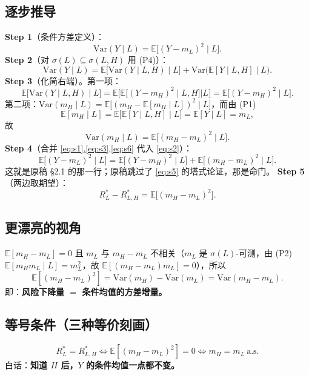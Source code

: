 \documentclass[UTF8,11pt,a4paper]{ctexart}
\newcommand{\E}{\mathbb{E}}
\newcommand{\Var}{\mathrm{Var}}
\begin{document}
\subsection{逐步推导}
\textbf{Step 1}（条件方差定义）：
\begin{equation}
\Var(Y\mid L)=\E\big[(Y-m_L)^2\mid L\big]. \label{eq:s1}
\end{equation}
\textbf{Step 2}（对 $\sigma(L)\subseteq\sigma(L,H)$ 用 (P4)）：
\begin{equation}
\Var(Y\mid L)=\E\big[\Var(Y\mid L,H)\mid L\big]+\Var\big(\E[Y\mid L,H]\mid L\big). \label{eq:s2}
\end{equation}
\textbf{Step 3}（化简右端）。第一项：
\begin{equation}
\E\big[\Var(Y\mid L,H)\mid L\big]
=\E\Big[\E\big[(Y-m_H)^2\mid L,H\big]\Big|L\Big]
=\E\big[(Y-m_H)^2\mid L\big]. \label{eq:s3}
\end{equation}
第二项：$\Var(m_H\mid L)=\E\big[(m_H-\E[m_H\mid L])^2\mid L\big]$，而由 (P1)
\begin{equation}
\E[m_H\mid L]=\E\big[\E[Y\mid L,H]\mid L\big]=\E[Y\mid L]=m_L, \label{eq:s5}
\end{equation}
故
\begin{equation}
\Var(m_H\mid L)=\E\big[(m_H-m_L)^2\mid L\big]. \label{eq:s6}
\end{equation}
\textbf{Step 4}（合并 \eqref{eq:s1},\eqref{eq:s3},\eqref{eq:s6} 代入 \eqref{eq:s2}）：
\begin{equation}
\E\big[(Y-m_L)^2\mid L\big]
=\E\big[(Y-m_H)^2\mid L\big]+\E\big[(m_H-m_L)^2\mid L\big]. \label{eq:s7}
\end{equation}
这就是原稿 §2.1 的那一行；原稿跳过了 \eqref{eq:s5} 的塔式论证，那是命门。
\textbf{Step 5}（两边取期望）：
\begin{equation}
R_L^*-R_{L,H}^*=\E\big[(m_H-m_L)^2\big]. \label{eq:s8}
\end{equation}

\subsection{更漂亮的视角}
$\E[m_H-m_L]=0$ 且 $m_L$ 与 $m_H-m_L$ 不相关（$m_L$ 是 $\sigma(L)$-可测，由 (P2) $\E[m_H m_L\mid L]=m_L^2$，故 $\E[(m_H-m_L)m_L]=0$），所以
\[
\E[(m_H-m_L)^2]=\Var(m_H)-\Var(m_L)=\Var(m_H-m_L).
\]
即：\textbf{风险下降量 $=$ 条件均值的方差增量。}

\subsection{等号条件（三种等价刻画）}
\[
R_L^*=R_{L,H}^*\iff \E[(m_H-m_L)^2]=0\iff m_H=m_L\ \text{a.s.}
\]
白话：\textbf{知道 $H$ 后，$Y$ 的条件均值一点都不变。}
\end{document}
